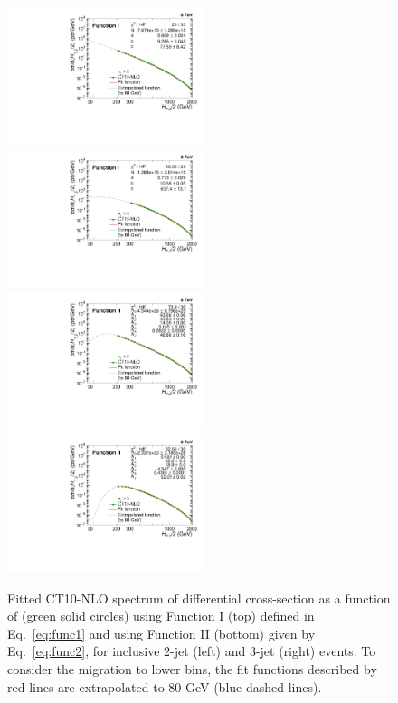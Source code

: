 \begin{figure}[ht]
  \begin{center}
    \hspace*{-5mm}\includegraphics[width=0.51\textwidth]{Plots_HT_2_150/Extrapolate_Theory_2_HT_2_150_funcI.pdf}%
    ~~\includegraphics[width=0.51\textwidth]{Plots_HT_2_150/Extrapolate_Theory_3_HT_2_150_funcI.pdf}\\
    \vspace{5mm}
    \hspace*{-5mm}\includegraphics[width=0.51\textwidth]{Plots_HT_2_150/Extrapolate_Theory_2_HT_2_150_funcII.pdf}%
    ~~\includegraphics[width=0.51\textwidth]{Plots_HT_2_150/Extrapolate_Theory_3_HT_2_150_funcII.pdf}
    \caption[Fitted CT10-NLO spectrum of differential cross-section as a function of \httwo.]{Fitted CT10-NLO spectrum of differential cross-section as a function of \httwo (green solid circles) using Function I (top) defined in Eq.~\ref{eq:func1} and using Function II (bottom) given by Eq.~\ref{eq:func2}, for inclusive 2-jet (left) and 3-jet (right) events. To consider the migration to lower \httwo bins, the fit functions described by red lines are extrapolated to 80 GeV (blue dashed lines).}
    \label{fig:fit}
  \end{center}
\end{figure}

